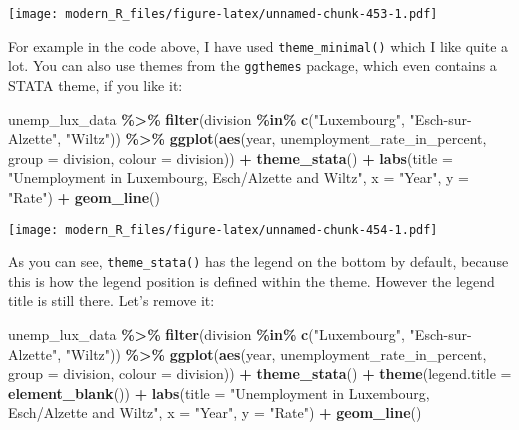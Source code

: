 \documentclass[
]{article}
\newenvironment{Shaded}{\begin{snugshade}}{\end{snugshade}}
\newcommand{\DataTypeTok}[1]{\textcolor[rgb]{0.13,0.29,0.53}{#1}}
\newcommand{\KeywordTok}[1]{\textcolor[rgb]{0.13,0.29,0.53}{\textbf{#1}}}
\newcommand{\NormalTok}[1]{#1}
\newcommand{\OperatorTok}[1]{\textcolor[rgb]{0.81,0.36,0.00}{\textbf{#1}}}
\newcommand{\StringTok}[1]{\textcolor[rgb]{0.31,0.60,0.02}{#1}}
\begin{document}
\texttt{[image: modern\_R\_files/figure-latex/unnamed-chunk-453-1.pdf]}

For example in the code above, I have used \texttt{theme\_minimal()} which I like quite a lot. You can also
use themes from the \texttt{ggthemes} package, which even contains a STATA theme, if you like it:

\begin{Shaded}
\begin{Highlighting}[]
\NormalTok{unemp\_lux\_data }\OperatorTok{\%\textgreater{}\%}
\StringTok{  }\KeywordTok{filter}\NormalTok{(division }\OperatorTok{\%in\%}\StringTok{ }\KeywordTok{c}\NormalTok{(}\StringTok{"Luxembourg"}\NormalTok{, }\StringTok{"Esch{-}sur{-}Alzette"}\NormalTok{, }\StringTok{"Wiltz"}\NormalTok{)) }\OperatorTok{\%\textgreater{}\%}
\StringTok{  }\KeywordTok{ggplot}\NormalTok{(}\KeywordTok{aes}\NormalTok{(year, unemployment\_rate\_in\_percent, }\DataTypeTok{group =}\NormalTok{ division, }\DataTypeTok{colour =}\NormalTok{ division)) }\OperatorTok{+}
\StringTok{  }\KeywordTok{theme\_stata}\NormalTok{() }\OperatorTok{+}
\StringTok{  }\KeywordTok{labs}\NormalTok{(}\DataTypeTok{title =} \StringTok{"Unemployment in Luxembourg, Esch/Alzette and Wiltz"}\NormalTok{, }\DataTypeTok{x =} \StringTok{"Year"}\NormalTok{, }\DataTypeTok{y =} \StringTok{"Rate"}\NormalTok{) }\OperatorTok{+}
\StringTok{  }\KeywordTok{geom\_line}\NormalTok{()}
\end{Highlighting}
\end{Shaded}

\texttt{[image: modern\_R\_files/figure-latex/unnamed-chunk-454-1.pdf]}

As you can see, \texttt{theme\_stata()} has the legend on the bottom by default, because this is how the
legend position is defined within the theme. However the legend title is still there. Let's remove
it:

\begin{Shaded}
\begin{Highlighting}[]
\NormalTok{unemp\_lux\_data }\OperatorTok{\%\textgreater{}\%}
\StringTok{  }\KeywordTok{filter}\NormalTok{(division }\OperatorTok{\%in\%}\StringTok{ }\KeywordTok{c}\NormalTok{(}\StringTok{"Luxembourg"}\NormalTok{, }\StringTok{"Esch{-}sur{-}Alzette"}\NormalTok{, }\StringTok{"Wiltz"}\NormalTok{)) }\OperatorTok{\%\textgreater{}\%}
\StringTok{  }\KeywordTok{ggplot}\NormalTok{(}\KeywordTok{aes}\NormalTok{(year, unemployment\_rate\_in\_percent, }\DataTypeTok{group =}\NormalTok{ division, }\DataTypeTok{colour =}\NormalTok{ division)) }\OperatorTok{+}
\StringTok{  }\KeywordTok{theme\_stata}\NormalTok{() }\OperatorTok{+}
\StringTok{  }\KeywordTok{theme}\NormalTok{(}\DataTypeTok{legend.title =} \KeywordTok{element\_blank}\NormalTok{()) }\OperatorTok{+}
\StringTok{  }\KeywordTok{labs}\NormalTok{(}\DataTypeTok{title =} \StringTok{"Unemployment in Luxembourg, Esch/Alzette and Wiltz"}\NormalTok{, }\DataTypeTok{x =} \StringTok{"Year"}\NormalTok{, }\DataTypeTok{y =} \StringTok{"Rate"}\NormalTok{) }\OperatorTok{+}
\StringTok{  }\KeywordTok{geom\_line}\NormalTok{()}
\end{Highlighting}
\end{Shaded}
\end{document}

